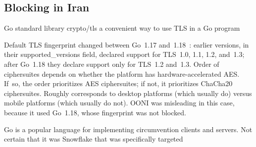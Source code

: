 \documentclass[letterpaper,twocolumn]{article}
\begin{document}
\subsection{Blocking in Iran}
\label{sec:block-ir}


Go standard library crypto/tls a convenient way to use TLS in a Go program

Default TLS fingerprint changed between Go~1.17 and~1.18~\cite{go1.18-tls10}:
earlier versions, in their supported\_\allowbreak versions field,
declared support for TLS~1.0, 1.1, 1.2, and~1.3;
after Go~1.18 they declare support only for TLS~1.2 and~1.3.
Order of ciphersuites depends on whether the platform has hardware-accelerated AES.
If~so, the order prioritizes AES ciphersuites; if not, it prioritizes ChaCha20 ciphersuites.
Roughly corresponds to desktop platforms (which usually do) versus mobile platforms (which usually do not).
OONI was misleading in this case, because it used Go~1.18, whose fingerprint was not blocked.

Go is a popular language for implementing circumvention clients and servers.
Not certain that it was Snowflake that was specifically targeted
\end{document}
